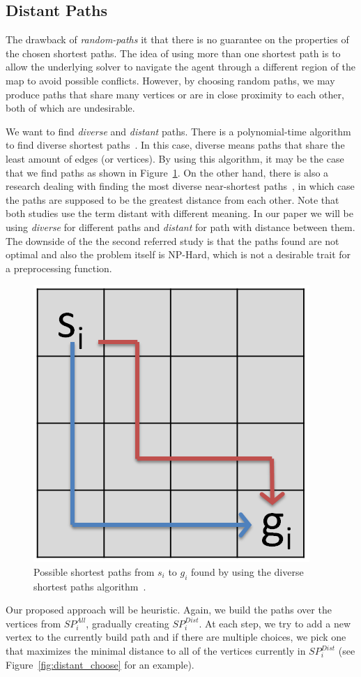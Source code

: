 \subsection{Distant Paths}



The drawback of \emph{random-paths} it that there is no guarantee on the properties of the chosen shortest paths. The idea of using more than one shortest path is to allow the underlying solver to navigate the agent through a different region of the map to avoid possible conflicts. However, by choosing random paths, we may produce paths that share many vertices or are in close proximity to each other, both of which are undesirable.

We want to find \emph{diverse} and \emph{distant} paths. There is a polynomial-time algorithm to find diverse shortest paths~\cite{diverse}. In this case, diverse means paths that share the least amount of edges (or vertices). By using this algorithm, it may be the case that we find paths as shown in Figure~\ref{fig:diverse}. On the other hand, there is also a research dealing with finding the most diverse near-shortest paths~\cite{distant}, in which case the paths are supposed to be the greatest distance from each other. Note that both studies use the term distant with different meaning. In our paper we will be using \emph{diverse} for different paths and \emph{distant} for path with distance between them. The downside of the the second referred study is that the paths found are not optimal and also the problem itself is NP-Hard, which is not a desirable trait for a preprocessing function.

\begin{figure}[hb]
\centering
\includegraphics[width=0.25\columnwidth]{img/diverse.PNG}
\caption{Possible shortest paths from $s_i$ to $g_i$ found by using the diverse shortest paths algorithm~\cite{diverse}.}
\label{fig:diverse}
\end{figure}


Our proposed approach will be heuristic. Again, we build the paths over the vertices from $SP_i^{All}$, gradually creating $SP_i^{Dist}$. At each step, we try to add a new vertex to the currently build path and if there are multiple choices, we pick one that maximizes the minimal distance to all of the vertices currently in $SP_i^{Dist}$ (see Figure~\ref{fig:distant_choose} for an example).

